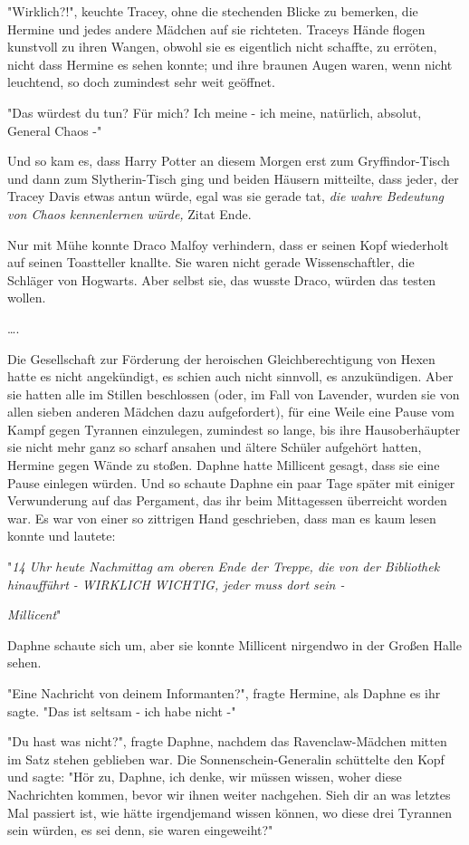 {"Wirklich?!", keuchte Tracey, ohne die stechenden Blicke zu bemerken, die Hermine und jedes andere Mädchen auf sie richteten. Traceys Hände flogen kunstvoll zu ihren Wangen, obwohl sie es eigentlich nicht schaffte, zu erröten, nicht dass Hermine es sehen konnte; und ihre braunen Augen waren, wenn nicht leuchtend, so doch zumindest sehr weit geöffnet.

"Das würdest du tun? Für mich? Ich meine - ich meine, natürlich, absolut, General Chaos -"

Und so kam es, dass Harry Potter an diesem Morgen erst zum Gryffindor-Tisch und dann zum Slytherin-Tisch ging und beiden Häusern mitteilte, dass jeder, der Tracey Davis etwas antun würde, egal was sie gerade tat, \emph{die wahre Bedeutung von Chaos kennenlernen würde,} Zitat Ende.

Nur mit Mühe konnte Draco Malfoy verhindern, dass er seinen Kopf wiederholt auf seinen Toastteller knallte. Sie waren nicht gerade Wissenschaftler, die Schläger von Hogwarts. Aber selbst sie, das wusste Draco, würden das testen wollen.

….

Die Gesellschaft zur Förderung der heroischen Gleichberechtigung von Hexen hatte es nicht angekündigt, es schien auch nicht sinnvoll, es anzukündigen. Aber sie hatten alle im Stillen beschlossen (oder, im Fall von Lavender, wurden sie von allen sieben anderen Mädchen dazu aufgefordert), für eine Weile eine Pause vom Kampf gegen Tyrannen einzulegen, zumindest so lange, bis ihre Hausoberhäupter sie nicht mehr ganz so scharf ansahen und ältere Schüler aufgehört hatten, Hermine gegen Wände zu stoßen. Daphne hatte Millicent gesagt, dass sie eine Pause einlegen würden. Und so schaute Daphne ein paar Tage später mit einiger Verwunderung auf das Pergament, das ihr beim Mittagessen überreicht worden war. Es war von einer so zittrigen Hand geschrieben, dass man es kaum lesen konnte und lautete:

"\emph{14 Uhr heute Nachmittag am oberen Ende der Treppe, die von der Bibliothek hinaufführt - WIRKLICH WICHTIG, jeder muss dort sein -}

\emph{Millicent}"

Daphne schaute sich um, aber sie konnte Millicent nirgendwo in der Großen Halle sehen.

"Eine Nachricht von deinem Informanten?", fragte Hermine, als Daphne es ihr sagte. "Das ist seltsam - ich habe nicht -"

"Du hast was nicht?", fragte Daphne, nachdem das Ravenclaw-Mädchen mitten im Satz stehen geblieben war. Die Sonnenschein-Generalin schüttelte den Kopf und sagte: "Hör zu, Daphne, ich denke, wir müssen wissen, woher diese Nachrichten kommen, bevor wir ihnen weiter nachgehen. Sieh dir an was letztes Mal passiert ist, wie hätte irgendjemand wissen können, wo diese drei Tyrannen sein würden, es sei denn, sie waren eingeweiht?"

}
